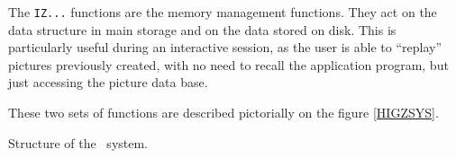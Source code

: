 The {\tt IZ...} functions are the memory management functions. They act on the
data structure in main storage and on the data stored on disk.
This is particularly useful during an interactive session, as the user is 
able to ``replay'' pictures previously created, with no need to recall the
application program, but just accessing the picture data base.
 
These two sets of functions are described pictorially on the figure 
\ref{HIGZSYS}.
 
\begin{Fighere}
\begin{center}\mbox{}\end{center}
\caption{Structure of the \HIGZ~system.}
\label{HIGZSYS}
\end{Fighere}
 

